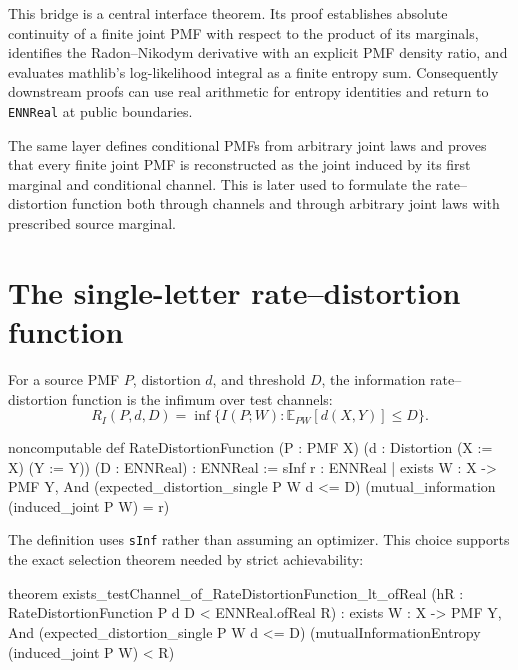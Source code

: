 \documentclass[11pt]{article}
\newcommand{\E}{\mathbb{E}}
\newcommand{\RD}{R_I}
\newcommand{\MI}{I}
\begin{document}
This bridge is a central interface theorem.  Its proof establishes absolute
continuity of a finite joint PMF with respect to the product of its marginals,
identifies the Radon--Nikodym derivative with an explicit PMF density ratio,
and evaluates mathlib's log-likelihood integral as a finite entropy sum.
Consequently downstream proofs can use real arithmetic for entropy identities
and return to \texttt{ENNReal} at public boundaries.

The same layer defines conditional PMFs from arbitrary joint laws and proves
that every finite joint PMF is reconstructed as the joint induced by its first
marginal and conditional channel.  This is later used to formulate the
rate--distortion function both through channels and through arbitrary joint
laws with prescribed source marginal.

\section{The single-letter rate--distortion function}

For a source PMF $P$, distortion $d$, and threshold $D$, the information
rate--distortion function is the infimum over test channels:
\[
  \RD(P,d,D)=
  \inf\{\MI(P;W):\E_{PW}[d(X,Y)]\le D\}.
\]

\begin{LeanCode}
noncomputable def RateDistortionFunction
    (P : PMF X) (d : Distortion (X := X) (Y := Y))
    (D : ENNReal) : ENNReal :=
  sInf {r : ENNReal | exists W : X -> PMF Y, And
    (expected_distortion_single P W d <= D)
    (mutual_information (induced_joint P W) = r)}
\end{LeanCode}

The definition uses \texttt{s\allowbreak Inf} rather than assuming an optimizer.  This
choice supports the exact selection theorem needed by strict achievability:

\begin{LeanCode}
theorem exists_testChannel_of_RateDistortionFunction_lt_ofReal
    (hR : RateDistortionFunction P d D < ENNReal.ofReal R) :
  exists W : X -> PMF Y, And
    (expected_distortion_single P W d <= D)
    (mutualInformationEntropy (induced_joint P W) < R)
\end{LeanCode}
\end{document}
